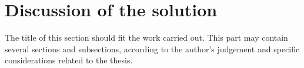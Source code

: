 \chapter{Discussion of the solution}

The title of this section should fit the work carried out. This part may contain several sections and subsections, according to the author's judgement and specific considerations related to the thesis.